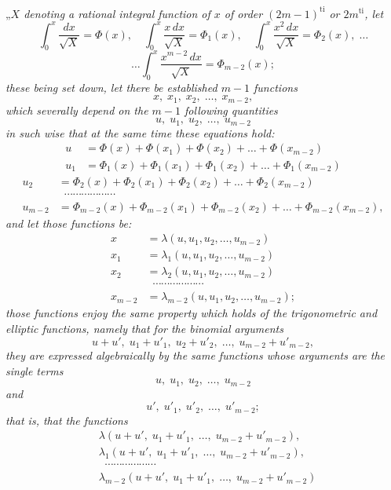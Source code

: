 \documentclass{article}
\begin{document}
„\emph{$X$ denoting a rational integral function of $x$ of order $(2m-1)^{\text{ti}}$ or $2m^{\text{ti}}$, let}
\[ \int_0^{x} \frac{dx}{\sqrt{X}} = \Phi(x), \quad \int_0^{x} \frac{x\,dx}{\sqrt{X}} = \Phi_1(x), \quad \int_0^{x} \frac{x^{2}\,dx}{\sqrt{X}} = \Phi_2(x), \; \ldots \]
\[ \ldots \int_0^{x} \frac{x^{m-2}\,dx}{\sqrt{X}} = \Phi_{m-2}(x); \]
\emph{these being set down, let there be established $m-1$ functions}
\[ x, \; x_1, \; x_2, \; \ldots, \; x_{m-2}, \]
\emph{which severally depend on the $m-1$ following quantities}
\[ u, \; u_1, \; u_2, \; \ldots, \; u_{m-2} \]
\emph{in such wise that at the same time these equations hold:}
\[ \begin{aligned} u &= \Phi(x) + \Phi(x_1) + \Phi(x_2) + \ldots + \Phi(x_{m-2}) \\ u_1 &= \Phi_1(x) + \Phi_1(x_1) + \Phi_1(x_2) + \ldots + \Phi_1(x_{m-2}) \end{aligned} \]
\[ \begin{aligned} u_2 &= \Phi_2(x) + \Phi_2(x_1) + \Phi_2(x_2) + \ldots + \Phi_2(x_{m-2}) \\ &\;\; \cdots\cdots\cdots\cdots\cdots\cdots \\ u_{m-2} &= \Phi_{m-2}(x) + \Phi_{m-2}(x_1) + \Phi_{m-2}(x_2) + \ldots + \Phi_{m-2}(x_{m-2}), \end{aligned} \]
\emph{and let those functions be:}
\[ \begin{aligned} x &= \lambda(u, u_1, u_2, \ldots, u_{m-2}) \\ x_1 &= \lambda_1(u, u_1, u_2, \ldots, u_{m-2}) \\ x_2 &= \lambda_2(u, u_1, u_2, \ldots, u_{m-2}) \\ &\;\; \cdots\cdots\cdots\cdots\cdots\cdots \\ x_{m-2} &= \lambda_{m-2}(u, u_1, u_2, \ldots, u_{m-2}); \end{aligned} \]
\emph{those functions enjoy the same property which holds of the trigonometric and elliptic functions, namely that for the binomial arguments}
\[ u + u', \; u_1 + u'_1, \; u_2 + u'_2, \; \ldots, \; u_{m-2} + u'_{m-2}, \]
\emph{they are expressed algebraically by the same functions whose arguments are the single terms}
\[ u, \; u_1, \; u_2, \; \ldots, \; u_{m-2} \]
\emph{and}
\[ u', \; u'_1, \; u'_2, \; \ldots, \; u'_{m-2}; \]
\emph{that is, that the functions}
\[ \begin{aligned} &\lambda(u + u', \; u_1 + u'_1, \; \ldots, \; u_{m-2} + u'_{m-2}), \\ &\lambda_1(u + u', \; u_1 + u'_1, \; \ldots, \; u_{m-2} + u'_{m-2}), \\ &\;\; \cdots\cdots\cdots\cdots\cdots\cdots \\ &\lambda_{m-2}(u + u', \; u_1 + u'_1, \; \ldots, \; u_{m-2} + u'_{m-2}) \end{aligned} \]
\end{document}
